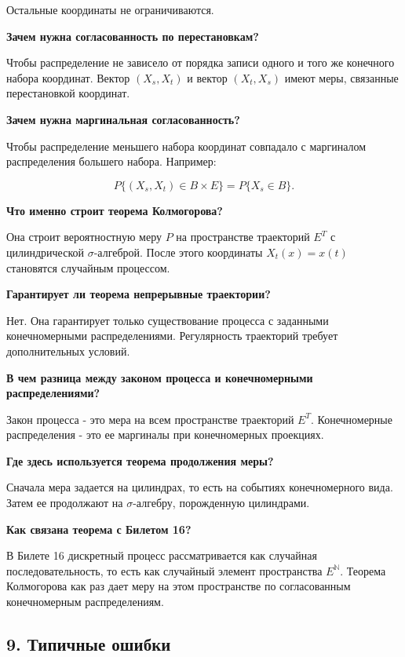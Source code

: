 \documentclass[
  11pt,
  a4paper,
]{article}
\begin{document}
Остальные координаты не ограничиваются.

\textbf{Зачем нужна согласованность по перестановкам?}

Чтобы распределение не зависело от порядка записи одного и того же
конечного набора координат. Вектор \((X_s,X_t)\) и вектор \((X_t,X_s)\)
имеют меры, связанные перестановкой координат.

\textbf{Зачем нужна маргинальная согласованность?}

Чтобы распределение меньшего набора координат совпадало с маргиналом
распределения большего набора. Например:

\[
P\{(X_s,X_t)\in B\times E\}
=
P\{X_s\in B\}.
\]

\textbf{Что именно строит теорема Колмогорова?}

Она строит вероятностную меру \(P\) на пространстве траекторий \(E^T\) с
цилиндрической \(\sigma\)-алгеброй. После этого координаты
\(X_t(x)=x(t)\) становятся случайным процессом.

\textbf{Гарантирует ли теорема непрерывные траектории?}

Нет. Она гарантирует только существование процесса с заданными
конечномерными распределениями. Регулярность траекторий требует
дополнительных условий.

\textbf{В чем разница между законом процесса и конечномерными
распределениями?}

Закон процесса - это мера на всем пространстве траекторий \(E^T\).
Конечномерные распределения - это ее маргиналы при конечномерных
проекциях.

\textbf{Где здесь используется теорема продолжения меры?}

Сначала мера задается на цилиндрах, то есть на событиях конечномерного
вида. Затем ее продолжают на \(\sigma\)-алгебру, порожденную цилиндрами.

\textbf{Как связана теорема с Билетом 16?}

В Билете 16 дискретный процесс рассматривается как случайная
последовательность, то есть как случайный элемент пространства
\(E^{\mathbb N}\). Теорема Колмогорова как раз дает меру на этом
пространстве по согласованным конечномерным распределениям.

\subsection{9. Типичные
ошибки}\label{ux442ux438ux43fux438ux447ux43dux44bux435-ux43eux448ux438ux431ux43aux438}
\end{document}
